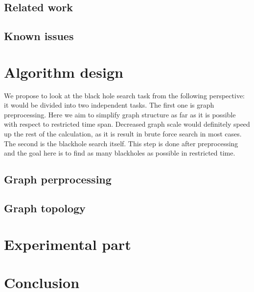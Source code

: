 \documentclass{svproc}
\providecommand{\doi}[1]{doi:\discretionary{}{}{}#1}
\begin{document}
%
\subsection{Related work}
\cite{li2010detecting,li2012mining,li2014mining,hong2015detecting}

%
\subsection{Known issues}
%

%
\section{Algorithm design}
We propose to look at the black hole search task from the following perspective: it would be divided into two independent 
tasks. 
The first one is graph preprocessing. Here we aim to simplify graph structure as far as it is possible with respect to
restricted time span. Decreased graph scale would definitely speed up the rest of the calculation, as it is result in brute force search in most cases.
The second is the blackhole search itself. This step is done after preprocessing and the goal here is to find as many blackholes as possible in restricted time.
%

%
\subsection{Graph perprocessing}
%

%
\subsection{Graph topology}
%

%
\section{Experimental part}
%

%
\section{Conclusion}
%

%
%






\end{document}
